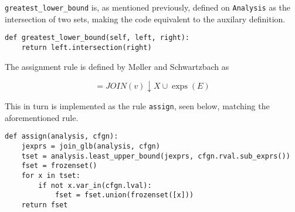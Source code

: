 \noindent \texttt{greatest\_lower\_bound} is, as mentioned previously, defined on \texttt{Analysis} as the intersection of two sets, making the code equivalent to the auxilary definition. 

\begin{verbatim}
def greatest_lower_bound(self, left, right): 
    return left.intersection(right)
\end{verbatim}

\noindent The assignment rule is defined by Møller and Schwartzbach as

\begin{equation}
    [v]=J O I N(v) \downarrow X \cup \operatorname{exps}(E)
\end{equation}

\noindent This in turn is implemented as the rule \texttt{assign}, seen below, matching the aforementioned rule. 

\begin{verbatim}
def assign(analysis, cfgn):
    jexprs = join_glb(analysis, cfgn)
    tset = analysis.least_upper_bound(jexprs, cfgn.rval.sub_exprs())
    fset = frozenset()
    for x in tset:
        if not x.var_in(cfgn.lval):
            fset = fset.union(frozenset([x]))
    return fset
\end{verbatim}